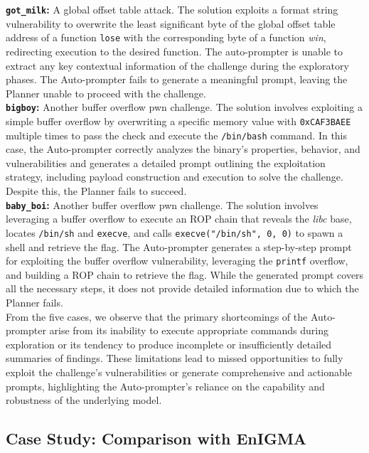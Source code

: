 \noindent
\textbf{\texttt{got\_milk}:} A global offset table attack. The solution exploits a format string vulnerability to overwrite the least significant byte of the global offset table address of a function \texttt{lose} with the corresponding byte of a function \textit{win}, redirecting execution to the desired function. The auto-prompter is unable to extract any key contextual information of the challenge during the exploratory phases. The Auto-prompter fails to generate a meaningful prompt, leaving the Planner unable to proceed with the challenge.
\\

\noindent
\textbf{\texttt{bigboy}:}  Another buffer overflow pwn challenge. The solution involves exploiting a simple buffer overflow by overwriting a specific memory value with \texttt{0xCAF3BAEE} multiple times to pass the check and execute the \texttt{/bin/bash} command. In this case, the Auto-prompter correctly analyzes the binary’s properties, behavior, and vulnerabilities  and generates a detailed prompt outlining the exploitation strategy, including payload construction and execution to solve the challenge. Despite this, the Planner fails to succeed.
\\

\noindent
\textbf{\texttt{baby\_boi}:} Another buffer overflow pwn challenge. The solution involves leveraging a buffer overflow to execute an ROP chain that reveals the \textit{libc} base, locates \texttt{/bin/sh} and \texttt{execve}, and calls \texttt{execve("/bin/sh", 0, 0)} to spawn a shell and retrieve the flag. The Auto-prompter generates a step-by-step prompt for exploiting the buffer overflow vulnerability, leveraging the \texttt{printf} overflow, and building a ROP chain to retrieve the flag. While the generated prompt covers all the necessary steps, it does not provide detailed information due to which the Planner fails.
\\

From the five cases, we observe that the primary shortcomings of the Auto-prompter arise from its inability to execute appropriate commands during exploration or its tendency to produce incomplete or insufficiently detailed summaries of findings. These limitations lead to missed opportunities to fully exploit the challenge’s vulnerabilities or generate comprehensive and actionable prompts, highlighting the Auto-prompter’s reliance on the capability and robustness of the underlying model.

\subsection{Case Study: Comparison with EnIGMA}
\label{sec:casestudy_enigma}

